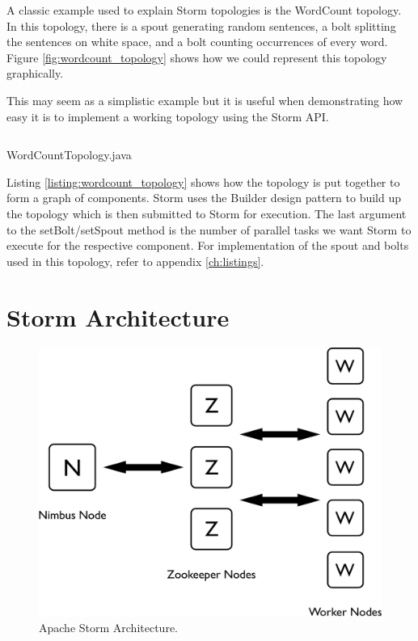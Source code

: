 A classic example used to explain Storm topologies is the WordCount topology. In this topology, there is a spout generating random sentences, a bolt splitting the sentences on white space, and a bolt counting occurrences of every word. Figure \ref{fig:wordcount_topology} shows how we could represent this topology graphically.

This may seem as a simplistic example but it is useful when demonstrating how easy it is to implement a working topology using the Storm API.

\begin{listing}[!htb]
\inputminted{java}{code/WordCountTopology.java}
\caption{WordCountTopology.java}
\label{listing:wordcount_topology}
\end{listing}

Listing \ref{listing:wordcount_topology} shows how the topology is put together to form a graph of components. Storm uses the Builder design pattern to build up the topology which is then submitted to Storm for execution. The last argument to the setBolt/setSpout method is the number of parallel tasks we want Storm to execute for the respective component. For implementation of the spout and bolts used in this topology, refer to appendix \ref{ch:listings}.

\section{Storm Architecture}
\label{sec:storm_arch}

\begin{figure}[!htb]
	\centering
	\includegraphics[scale=0.5]{pdf/storm_arch.pdf}
	\caption{Apache Storm Architecture.}
	\label{fig:storm_arch}
\end{figure}

